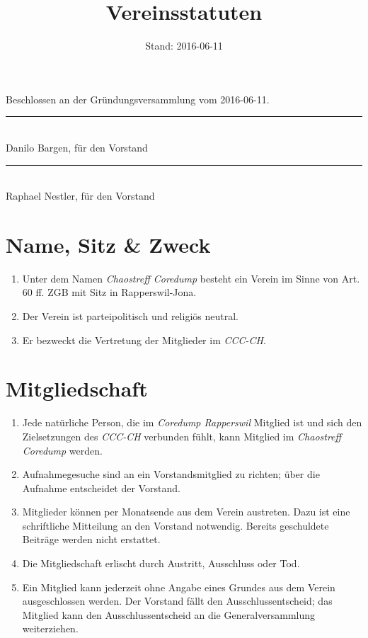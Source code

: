 \documentclass[10pt,a4paper,parskip,fleqn]{scrartcl}
\title{\Huge Vereinsstatuten}
\date{Stand: 2016-06-11}
\newcommand{\ol}{\begin{enumerate}[itemsep=-0.2em,topsep=-0.2em]}
\newcommand{\lo}{\end{enumerate}}
\newcommand{\li}{\item}
\newcommand{\name}{Chaostreff Coredump\xspace}
\newcommand{\iname}{\textit{\name}\xspace}
\newcommand{\parent}{Coredump Rapperswil\xspace}
\newcommand{\iparent}{\textit{\parent}\xspace}
\newcommand{\cccch}{CCC-CH\xspace}
\newcommand{\icccch}{\textit{\cccch}\xspace}
\begin{document}
\begin{titlepage}

	\maketitle
	\thispagestyle{empty} %

  \begin{center}

		\vspace{1cm}

		\theverbbox

		\vfill

		\large Beschlossen an der Gründungsversammlung vom 2016-06-11.

		\vspace{1.5cm}

		\begin{minipage}[t]{0.49\textwidth}
			\center
			\rule{5cm}{0.2mm}\\
			Danilo Bargen, für den Vorstand
		\end{minipage}
		\begin{minipage}[t]{0.49\textwidth}
			\center
			\rule{5cm}{0.2mm}\\
			Raphael Nestler, für den Vorstand
		\end{minipage}

  \end{center}

\end{titlepage}


\section{Name, Sitz \& Zweck}

\ol
	\li Unter dem Namen \iname besteht ein Verein im Sinne von Art. 60
	ff. ZGB mit Sitz in Rapperswil-Jona.
	\li Der Verein ist parteipolitisch und religiös neutral.
	\li Er bezweckt die Vertretung der Mitglieder im \icccch.
\lo


\section{Mitgliedschaft}

\ol
  \li Jede natürliche Person, die im \iparent Mitglied ist und sich den
	Zielsetzungen des \icccch verbunden fühlt, kann Mitglied im \iname werden.
	\li Aufnahmegesuche sind an ein Vorstandsmitglied zu richten; über die
	Aufnahme entscheidet der Vorstand.
	\li Mitglieder können per Monatsende aus dem Verein austreten. Dazu ist eine
	schriftliche Mitteilung an den Vorstand notwendig. Bereits geschuldete
	Beiträge werden nicht erstattet.
	\li Die Mitgliedschaft erlischt durch Austritt, Ausschluss oder Tod.
	\li Ein Mitglied kann jederzeit ohne Angabe eines Grundes aus dem Verein
	ausgeschlossen werden. Der Vorstand fällt den Ausschlussentscheid; das
	Mitglied kann den Ausschlussentscheid an die Generalversammlung weiterziehen.
\lo
\end{document}

